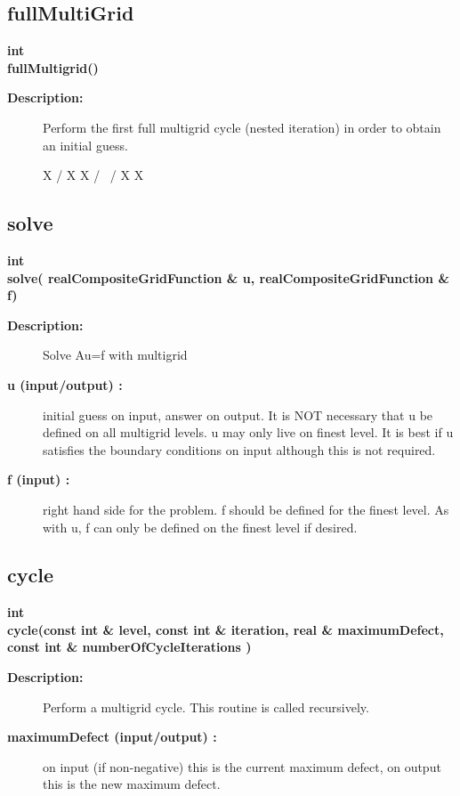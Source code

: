 \subsection{fullMultiGrid}
 
\begin{flushleft} \textbf{%
int  \\ 
\settowidth{\OgmgIncludeArgIndent}{fullMultigrid(}%
fullMultigrid()
}\end{flushleft}
\begin{description}
\item[{\bf Description:}] 
    Perform the first full multigrid cycle (nested iteration) in order to obtain an initial guess.


                        X
                       /
                  X   X
                 / \ /
                X   X

\end{description}
\subsection{solve}
 
\begin{flushleft} \textbf{%
int  \\ 
\settowidth{\OgmgIncludeArgIndent}{solve(}%
solve( realCompositeGridFunction \& u, realCompositeGridFunction \& f)
}\end{flushleft}
\begin{description}
\item[{\bf Description:}] 
   Solve Au=f with multigrid

\item[{\bf u (input/output) :}]  initial guess on input, answer on output. It is NOT necessary
    that u be defined on all multigrid levels. u may only live on finest level.
    It is best if u satisfies the boundary conditions on input although this is not required.
\item[{\bf f (input) :}]  right hand side for the problem. f should be defined for the finest level.
    As with u, f can only be defined on the finest level if desired.
\end{description}
\subsection{cycle}
 
\begin{flushleft} \textbf{%
int  \\ 
\settowidth{\OgmgIncludeArgIndent}{cycle(}%
cycle(const int \& level, const int \& iteration, real \& maximumDefect, const int \& numberOfCycleIterations )
}\end{flushleft}
\begin{description}
\item[{\bf Description:}] 
   Perform a multigrid cycle. This routine is called recursively.

\item[{\bf maximumDefect (input/output) :}]  on input (if non-negative) 
     this is the current maximum defect, on output this is the new  maximum defect.

\end{description}
